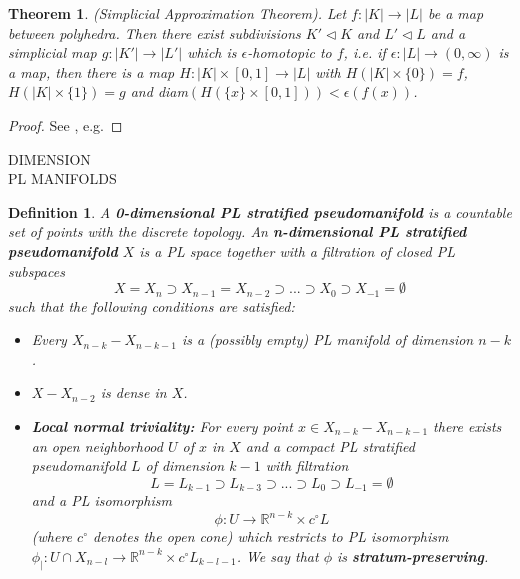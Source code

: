 \documentclass[11pt]{book}
\newtheorem{theorem}{Theorem}
\newtheorem{definition}{Definition}
\begin{document}
\begin{theorem}(Simplicial Approximation Theorem).
Let $f: |K| \to |L|$ be a map between polyhedra. Then there exist subdivisions $K' \lhd K$ and $L' \lhd L$ and a simplicial map $g: |K'| \to |L'|$ which is $\epsilon$-homotopic to $f$, i.e. if $\epsilon: |L| \to (0,\infty)$ is a map, then there is a map $H: |K| \times [0,1] \to |L|$ with $H(|K| \times \{ 0\})=f$, $H(|K| \times \{ 1\})=g$ and diam$(H(\{ x \} \times [0,1])) < \epsilon(f(x))$.
\end{theorem}

\begin{proof}
See \cite{lecturenotes}, e.g.
\end{proof}

DIMENSION \\
PL MANIFOLDS

\begin{definition}
A \textbf{0-dimensional PL stratified pseudomanifold} is a countable set of points with the discrete topology. An \textbf{n-dimensional PL stratified pseudomanifold} $X$ is a PL space together with a filtration of closed PL subspaces
\begin{equation*}
X=X_n \supset X_{n-1} = X_{n-2} \supset ... \supset X_0 \supset X_{-1} = \emptyset
\end{equation*}
such that the following conditions are satisfied:
\begin{itemize}
\item Every $X_{n-k} - X_{n-k-1}$ is a (possibly empty) PL manifold of dimension $n-k$.
\item $X-X_{n-2}$ is dense in $X$.
\item \textbf{Local normal triviality:} For every point $x \in X_{n-k} - X_{n-k-1}$ there exists an open neighborhood $U$ of $x$  in $X$ and a compact PL stratified pseudomanifold $L$ of dimension $k-1$ with filtration
\begin{equation*}
L = L_{k-1} \supset L_{k-3} \supset ... \supset L_0 \supset L_{-1}= \emptyset
\end{equation*}
and a PL isomorphism
\begin{equation*}
\phi : U \to \mathbb{R}^{n-k} \times c^{\circ} L
\end{equation*}
(where $c^{\circ}$ denotes the open cone) which restricts to PL isomorphism $\phi_| : U \cap X_{n-l} \to \mathbb{R}^{n-k} \times c^{\circ} L_{k-l-1}$. We say that $\phi$ is \textbf{stratum-preserving}.
\end{itemize}
\end{definition}
\end{document}
